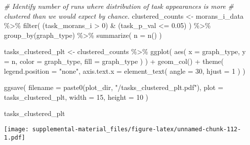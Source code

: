 \documentclass[
]{book}
\newenvironment{Shaded}{\begin{snugshade}}{\end{snugshade}}
\newcommand{\AttributeTok}[1]{\textcolor[rgb]{0.77,0.63,0.00}{#1}}
\newcommand{\CommentTok}[1]{\textcolor[rgb]{0.56,0.35,0.01}{\textit{#1}}}
\newcommand{\DecValTok}[1]{\textcolor[rgb]{0.00,0.00,0.81}{#1}}
\newcommand{\FloatTok}[1]{\textcolor[rgb]{0.00,0.00,0.81}{#1}}
\newcommand{\FunctionTok}[1]{\textcolor[rgb]{0.00,0.00,0.00}{#1}}
\newcommand{\NormalTok}[1]{#1}
\newcommand{\OtherTok}[1]{\textcolor[rgb]{0.56,0.35,0.01}{#1}}
\newcommand{\SpecialCharTok}[1]{\textcolor[rgb]{0.00,0.00,0.00}{#1}}
\newcommand{\StringTok}[1]{\textcolor[rgb]{0.31,0.60,0.02}{#1}}
\begin{document}
\begin{Shaded}
\begin{Highlighting}[]
\CommentTok{\# Identify number of runs where distribution of task appearances is more}
\CommentTok{\# clustered than we would expect by chance.}
\NormalTok{clustered\_counts }\OtherTok{\textless{}{-}}\NormalTok{ morans\_i\_data }\SpecialCharTok{\%\textgreater{}\%}
  \FunctionTok{filter}\NormalTok{(}
\NormalTok{    (task\_morans\_i }\SpecialCharTok{\textgreater{}} \DecValTok{0}\NormalTok{) }\SpecialCharTok{\&}\NormalTok{ (task\_p\_val }\SpecialCharTok{\textless{}=} \FloatTok{0.05}\NormalTok{)}
\NormalTok{  ) }\SpecialCharTok{\%\textgreater{}\%}
  \FunctionTok{group\_by}\NormalTok{(graph\_type) }\SpecialCharTok{\%\textgreater{}\%}
  \FunctionTok{summarize}\NormalTok{(}
    \AttributeTok{n =} \FunctionTok{n}\NormalTok{()}
\NormalTok{  )}
\end{Highlighting}
\end{Shaded}

\begin{Shaded}
\begin{Highlighting}[]
\NormalTok{tasks\_clustered\_plt }\OtherTok{\textless{}{-}}\NormalTok{ clustered\_counts }\SpecialCharTok{\%\textgreater{}\%}
  \FunctionTok{ggplot}\NormalTok{(}
    \FunctionTok{aes}\NormalTok{(}
      \AttributeTok{x =}\NormalTok{ graph\_type,}
      \AttributeTok{y =}\NormalTok{ n,}
      \AttributeTok{color =}\NormalTok{ graph\_type,}
      \AttributeTok{fill =}\NormalTok{ graph\_type}
\NormalTok{    )}
\NormalTok{  ) }\SpecialCharTok{+}
  \FunctionTok{geom\_col}\NormalTok{() }\SpecialCharTok{+}
  \FunctionTok{theme}\NormalTok{(}
    \AttributeTok{legend.position =} \StringTok{"none"}\NormalTok{,}
    \AttributeTok{axis.text.x =} \FunctionTok{element\_text}\NormalTok{(}
      \AttributeTok{angle =} \DecValTok{30}\NormalTok{,}
      \AttributeTok{hjust =} \DecValTok{1}
\NormalTok{    )}
\NormalTok{  )}

\FunctionTok{ggsave}\NormalTok{(}
  \AttributeTok{filename =} \FunctionTok{paste0}\NormalTok{(plot\_dir, }\StringTok{"/tasks\_clustered\_plt.pdf"}\NormalTok{),}
  \AttributeTok{plot =}\NormalTok{ tasks\_clustered\_plt,}
  \AttributeTok{width =} \DecValTok{15}\NormalTok{,}
  \AttributeTok{height =} \DecValTok{10}
\NormalTok{)}

\NormalTok{tasks\_clustered\_plt}
\end{Highlighting}
\end{Shaded}

\texttt{[image: supplemental-material\_files/figure-latex/unnamed-chunk-112-1.pdf]}
\end{document}
